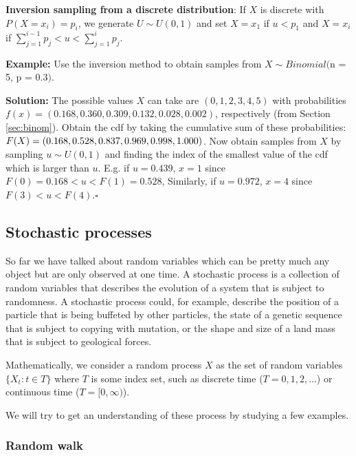 \documentclass[11pt]{article}
\newcommand{\sqend}{\hfill $\square$}
\begin{document}
{\bf Inversion sampling from a discrete distribution}: If $X$ is discrete with  $P(X = x_i) = p_i$, we generate $U \sim U(0,1)$ and set $X = x_1$ if $u< p_1$ and $X = x_i$ if $\sum_{j = 1}^{i-1}p_j < u < \sum _{j = 1}^i p_j$.

{\bf Example:} Use the inversion method  to obtain samples from $X \sim Binomial($n = 5, p = 0.3$)$.

{\bf Solution:} The possible values $X$  can take are $(0,1,2,3,4,5 )$ with probabilities $f(x) = (  0.168, 0.360 ,0.309 ,0.132 ,0.028, 0.002)$, respectively (from Section \ref{sec:binom}).  Obtain the cdf by taking the cumulative sum of these probabilities:  $F(X) = ( 0.168, 0.528, 0.837 ,\\0.969, 0.998 ,1.000)$.  Now obtain samples from $X$ by sampling $u \sim U(0,1)$ and finding the index of the smallest value of the cdf which is larger than $u$.  E.g. if $u = 0.439$, $x = 1$ since $F(0) = 0.168 < u < F(1) = 0.528$,  Similarly,  if $u = 0.972$, $x = 4$ since $F(3) < u < F(4)$.\sqend



\newpage

\subsection{Stochastic processes}

So far we have talked about random variables which can be pretty much any object but are only observed at one time. A stochastic process is a collection of random variables that describes the evolution of a system that is subject to randomness.   A stochastic process could, for example, describe the position of a particle that is being buffeted by other particles, the state of a genetic sequence that is subject to copying with mutation, or the shape and size of a land mass that is subject to geological forces.  

Mathematically, we consider a random process $X$ as the set of random variables $\{X_t: t \in T\}$ where $T$ is some index set, such as discrete time ($T = 0,1,2,\ldots$) or continuous time ($T = [0,\infty)$). 

We will try to get an understanding of these process by studying a few examples. 

\subsubsection{Random walk}
\end{document}
